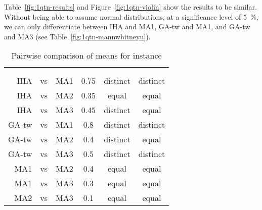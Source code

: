 \documentclass[thesis.tex]{subfiles}
\begin{document}
\subsubsection{}
   \renewcommand{\CurrentInstance}{\Instance{1qtn}}
   \renewcommand{\CurrentInstanceFileEscaped}{1qtn}
   \renewcommand{\CurrentInstanceTexEscaped}{1qtn}



Table~\vref{fig:1qtn-results} and Figure~\vref{fig:1qtn-violin} show the results to be similar. Without being able to assume normal distributions, at a significance level of \SI{5}{\percent}, we can only differentiate between \gls{IHA} and \gls{MA1}, \gls{GA-tw} and \gls{MA1}, and \gls{GA-tw} and \gls{MA3} (see Table~\vref{fig:1qtn-mannwhitneyu}).
\begin{table}[htbp]
   \caption{Pairwise comparison of means for instance \CurrentInstance}
   \label{fig:\CurrentInstanceFileEscaped-mannwhitneyu}
   \centering\small
      \begin{tabular}{r@{\ }c@{\ }l S[table-format=2.2] c c} \toprule
         &&&                          &  \\ \cmidrule(lr){5-6}
         &&&  &  &  \\ \midrule

         \gls{IHA} &vs& \gls{MA1}   &  0.75 & distinct & distinct \\
         \gls{IHA} &vs& \gls{MA2}   &  0.35 &  equal   &  equal   \\
         \gls{IHA} &vs& \gls{MA3}   &  0.45 & distinct &  equal   \\
         \gls{GA-tw} &vs& \gls{MA1} &  0.8  & distinct & distinct \\
         \gls{GA-tw} &vs& \gls{MA2} &  0.4  & distinct &  equal   \\
         \gls{GA-tw} &vs& \gls{MA3} &  0.5  & distinct & distinct \\
         \gls{MA1} &vs& \gls{MA2}   &  0.4  &  equal   &  equal   \\
         \gls{MA1} &vs& \gls{MA3}   &  0.3  &  equal   &  equal   \\
         \gls{MA2} &vs& \gls{MA3}   &  0.1  &  equal   &  equal   \\
         \bottomrule
      \end{tabular}
\end{table}
\end{document}
